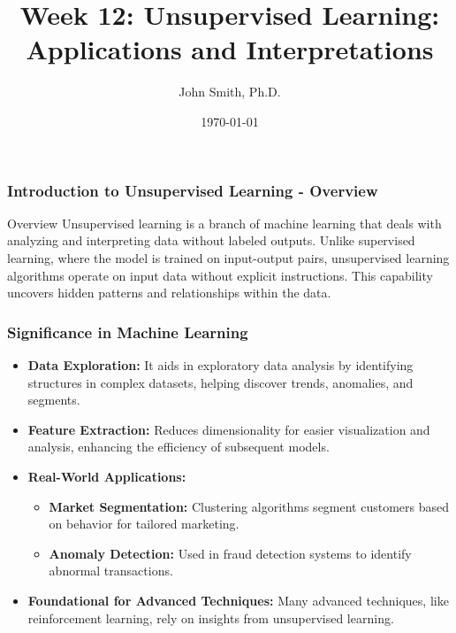 \documentclass[aspectratio=169]{beamer}
\title[Unsupervised Learning]{Week 12: Unsupervised Learning: Applications and Interpretations}
\author[J. Smith]{John Smith, Ph.D.}
\institute[University Name]{
  Department of Computer Science\\
  University Name\\
  \vspace{0.3cm}
  Email: email@university.edu\\
  Website: www.university.edu
}
\date{\today}
\begin{document}
\frame{\titlepage}

\begin{frame}[fragile]
    \titlepage
\end{frame}

\begin{frame}[fragile]
    \frametitle{Introduction to Unsupervised Learning - Overview}
    
    \begin{block}{Overview}
        Unsupervised learning is a branch of machine learning that deals with analyzing and interpreting data without labeled outputs. Unlike supervised learning, where the model is trained on input-output pairs, unsupervised learning algorithms operate on input data without explicit instructions. This capability uncovers hidden patterns and relationships within the data.
    \end{block}
\end{frame}

\begin{frame}[fragile]
    \frametitle{Significance in Machine Learning}
    
    \begin{itemize}
        \item \textbf{Data Exploration:} It aids in exploratory data analysis by identifying structures in complex datasets, helping discover trends, anomalies, and segments.
        
        \item \textbf{Feature Extraction:} Reduces dimensionality for easier visualization and analysis, enhancing the efficiency of subsequent models.
        
        \item \textbf{Real-World Applications:}
        \begin{itemize}
            \item \textbf{Market Segmentation:} Clustering algorithms segment customers based on behavior for tailored marketing.
            \item \textbf{Anomaly Detection:} Used in fraud detection systems to identify abnormal transactions.
        \end{itemize}
        
        \item \textbf{Foundational for Advanced Techniques:} Many advanced techniques, like reinforcement learning, rely on insights from unsupervised learning.
    \end{itemize}
\end{frame}
\end{document}

